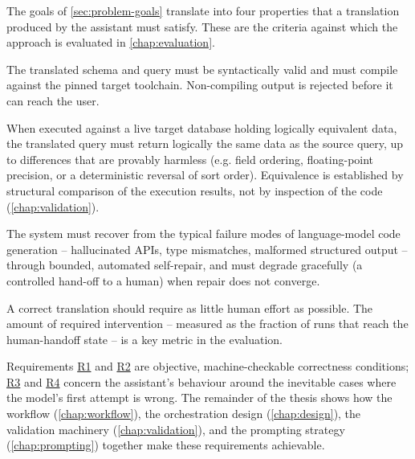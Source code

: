 The goals of \cref{sec:problem-goals} translate into four properties that a translation produced by the assistant must satisfy. These are the criteria against which the approach is evaluated in \cref{chap:evaluation}.

\begin{description}
  \label{desc:requirements-r1} \item[R1 -- Transformation correctness.] The translated schema and query must be syntactically valid and must compile against the pinned target toolchain. Non-compiling output is rejected before it can reach the user.

  \label{desc:requirements-r2} \item[R2 -- Semantic preservation.] When executed against a live target database holding logically equivalent data, the translated query must return logically the same data as the source query, up to differences that are provably harmless (e.g. field ordering, floating-point precision, or a deterministic reversal of sort order). Equivalence is established by structural comparison of the execution results, not by inspection of the code (\cref{chap:validation}).

  \label{desc:requirements-r3} \item[R3 -- Robustness.] The system must recover from the typical failure modes of language-model code generation -- hallucinated APIs, type mismatches, malformed structured output -- through bounded, automated self-repair, and must degrade gracefully (a controlled hand-off to a human) when repair does not converge.

  \label{desc:requirements-r4} \item[R4 -- Minimal manual intervention.] A correct translation should require as little human effort as possible. The amount of required intervention -- measured as the fraction of runs that reach the human-handoff state -- is a key metric in the evaluation.
\end{description}

Requirements \hyperref[desc:requirements-r1]{R1} and \hyperref[desc:requirements-r2]{R2} are objective, machine-checkable correctness conditions; \hyperref[desc:requirements-r3]{R3} and \hyperref[desc:requirements-r4]{R4} concern the assistant's behaviour around the inevitable cases where the model's first attempt is wrong. The remainder of the thesis shows how the workflow (\cref{chap:workflow}), the orchestration design (\cref{chap:design}), the validation machinery (\cref{chap:validation}), and the prompting strategy (\cref{chap:prompting}) together make these requirements achievable.
